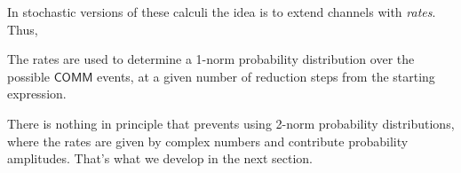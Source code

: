 In stochastic versions of these calculi the idea is to extend channels
with \emph{rates}. Thus,


The rates are used to determine a 1-norm probability distribution over
the possible $\mathsf{COMM}$ events, at a given number of reduction
steps from the starting expression.

There is nothing in principle that prevents using 2-norm probability
distributions, where the rates are given by complex numbers and
contribute probability amplitudes. That's what we develop in the next
section.
